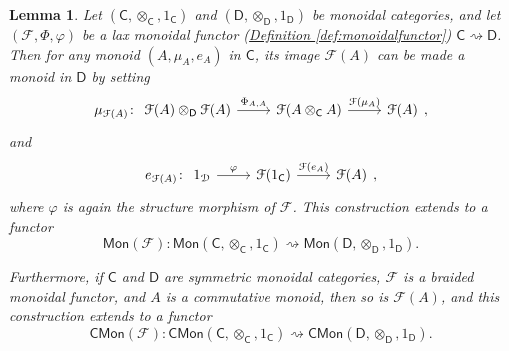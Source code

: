 \documentclass[a4paper]{report}
\theoremstyle{definition}
\theoremstyle{plain}
\newtheorem{lemma}{Lemma}[section]
\theoremstyle{remark}
\begin{document}
\begin{lemma}
  \label{lemma:monoidalfunctorspreserveinternalmonoids}
  Let $(\mathsf{C}, \otimes_{\mathsf{C}}, 1_{\mathsf{C}})$ and $(\mathsf{D}, \otimes_{\mathsf{D}}, 1_{\mathsf{D}})$ be monoidal categories, and let $(\mathcal{F}, \Phi, \varphi)$ be a lax monoidal functor (\hyperref[def:monoidalfunctor]{Definition \ref*{def:monoidalfunctor}}) $\mathsf{C} \rightsquigarrow \mathsf{D}$. Then for any monoid $(A, \mu_{A}, e_{A})$ in $\mathsf{C}$, its image $\mathcal{F}(A)$ can be made a monoid in $\mathsf{D}$ by setting
  \begin{equation*}
    \mu_{\mathcal{F}(A)}\colon 
    \begin{tikzcd}
      \mathcal{F}(A) \otimes_{\mathsf{D}} \mathcal{F}(A) 
      \arrow[r, "{\Phi_{A, A}}"]
      & \mathcal{F}(A \otimes_{\mathsf{C}} A) 
      \arrow[r, "\mathcal{F}(\mu_{A})"]
      & \mathcal{F}(A)
    \end{tikzcd},
  \end{equation*}
  and
  \begin{equation*}
    e_{\mathcal{F}(A)}\colon
    \begin{tikzcd}
      1_{\mathcal{D}}
      \arrow[r, "\varphi"]
      & \mathcal{F}(1_{\mathsf{C}})
      \arrow[r, "\mathcal{F}(e_{A})"]
      & \mathcal{F}(A)
    \end{tikzcd},
  \end{equation*}
  where $\varphi$ is again the structure morphism of $\mathcal{F}$. This construction extends to a functor 
  \begin{equation*}
    \mathsf{Mon}(\mathcal{F})\colon \mathsf{Mon}(\mathsf{C}, \otimes_{\mathsf{C}}, 1_{\mathsf{C}}) \rightsquigarrow \mathsf{Mon}(\mathsf{D}, \otimes_{\mathsf{D}}, 1_{\mathsf{D}}).
  \end{equation*}

  Furthermore, if $\mathsf{C}$ and $\mathsf{D}$ are symmetric monoidal categories, $\mathcal{F}$ is a braided monoidal functor, and $A$ is a commutative monoid, then so is $\mathcal{F}(A)$, and this construction extends to a functor
  \begin{equation*}
    \mathsf{CMon}(\mathcal{F})\colon \mathsf{CMon}(\mathsf{C}, \otimes_{\mathsf{C}}, 1_{\mathsf{C}}) \rightsquigarrow \mathsf{CMon}(\mathsf{D}, \otimes_{\mathsf{D}}, 1_{\mathsf{D}}). 
  \end{equation*}
\end{lemma} 
\end{document}
